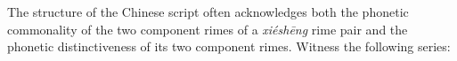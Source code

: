The structure of the Chinese script often acknowledges both the phonetic commonality of the two component rimes of a \textit{xiéshēng} rime pair and the phonetic distinctiveness of its two component rimes. 
Witness the following series: 

        \item %


